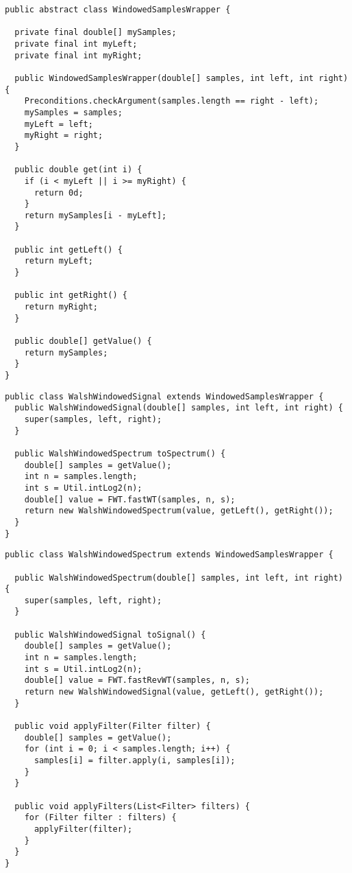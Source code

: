 \begin{lstlisting}[caption={Базовый класс для сигнала и спектра}]
public abstract class WindowedSamplesWrapper {

  private final double[] mySamples;
  private final int myLeft;
  private final int myRight;

  public WindowedSamplesWrapper(double[] samples, int left, int right) {
    Preconditions.checkArgument(samples.length == right - left);
    mySamples = samples;
    myLeft = left;
    myRight = right;
  }

  public double get(int i) {
    if (i < myLeft || i >= myRight) {
      return 0d;
    }
    return mySamples[i - myLeft];
  }

  public int getLeft() {
    return myLeft;
  }

  public int getRight() {
    return myRight;
  }

  public double[] getValue() {
    return mySamples;
  }
}
\end{lstlisting}

\begin{lstlisting}[caption={Оконный сигнал}]
public class WalshWindowedSignal extends WindowedSamplesWrapper {
  public WalshWindowedSignal(double[] samples, int left, int right) {
    super(samples, left, right);
  }

  public WalshWindowedSpectrum toSpectrum() {
    double[] samples = getValue();
    int n = samples.length;
    int s = Util.intLog2(n);
    double[] value = FWT.fastWT(samples, n, s);
    return new WalshWindowedSpectrum(value, getLeft(), getRight());
  }
}
\end{lstlisting}

\begin{lstlisting}[caption={Оконный спектр}]
public class WalshWindowedSpectrum extends WindowedSamplesWrapper {

  public WalshWindowedSpectrum(double[] samples, int left, int right) {
    super(samples, left, right);
  }

  public WalshWindowedSignal toSignal() {
    double[] samples = getValue();
    int n = samples.length;
    int s = Util.intLog2(n);
    double[] value = FWT.fastRevWT(samples, n, s);
    return new WalshWindowedSignal(value, getLeft(), getRight());
  }

  public void applyFilter(Filter filter) {
    double[] samples = getValue();
    for (int i = 0; i < samples.length; i++) {
      samples[i] = filter.apply(i, samples[i]);
    }
  }

  public void applyFilters(List<Filter> filters) {
    for (Filter filter : filters) {
      applyFilter(filter);
    }
  }
}
\end{lstlisting}

